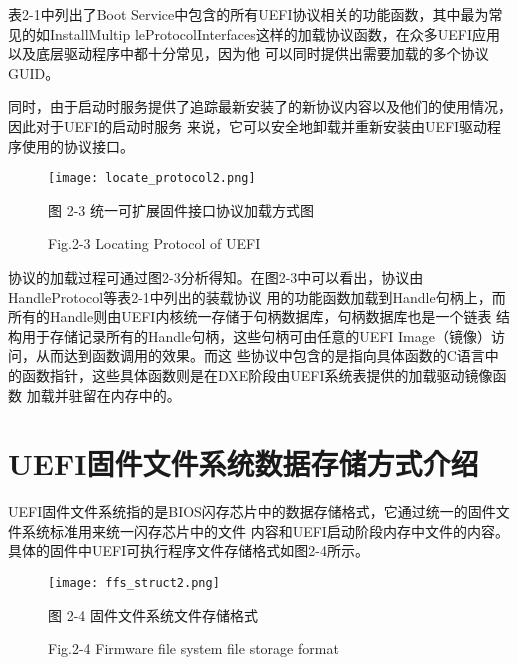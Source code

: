 表2-1中列出了Boot Service中包含的所有UEFI协议相关的功能函数，其中最为常见的如InstallMultip
leProtocolInterfaces这样的加载协议函数，在众多UEFI应用以及底层驱动程序中都十分常见，因为他
可以同时提供出需要加载的多个协议GUID。
\par 同时，由于启动时服务提供了追踪最新安装了的新协议内容以及他们的使用情况，因此对于UEFI的启动时服务
来说，它可以安全地卸载并重新安装由UEFI驱动程序使用的协议接口。

\begin{figure}[htb]
    \vspace{0cm}   
    \setlength{\abovecaptionskip}{0.3cm}  
	\centering
    \texttt{[image: locate\_protocol2.png]}
    \caption*{图 2-3 统一可扩展固件接口协议加载方式图}
    \setlength{\belowcaptionskip}{-0.7cm}
    \caption*{Fig.2-3 Locating Protocol of UEFI}
\end{figure}

\par 协议的加载过程可通过图2-3分析得知。在图2-3中可以看出，协议由HandleProtocol等表2-1中列出的装载协议
用的功能函数加载到Handle句柄上，而所有的Handle则由UEFI内核统一存储于句柄数据库，句柄数据库也是一个链表
结构用于存储记录所有的Handle句柄，这些句柄可由任意的UEFI Image（镜像）访问，从而达到函数调用的效果。而这
些协议中包含的是指向具体函数的C语言中的函数指针，这些具体函数则是在DXE阶段由UEFI系统表提供的加载驱动镜像函数
加载并驻留在内存中的。

%
%
\section{UEFI固件文件系统数据存储方式介绍}
UEFI固件文件系统指的是BIOS闪存芯片中的数据存储格式，它通过统一的固件文件系统标准用来统一闪存芯片中的文件
内容和UEFI启动阶段内存中文件的内容\cite{chinese21}。具体的固件中UEFI可执行程序文件存储格式如图2-4所示。

\begin{figure}[htb]
    \vspace{0cm}   
    \setlength{\abovecaptionskip}{0.3cm}  
	\centering
    \texttt{[image: ffs\_struct2.png]}
    \caption*{图 2-4 固件文件系统文件存储格式}
    \setlength{\belowcaptionskip}{-0.4cm}
    \caption*{Fig.2-4 Firmware file system file storage format}
\end{figure}

